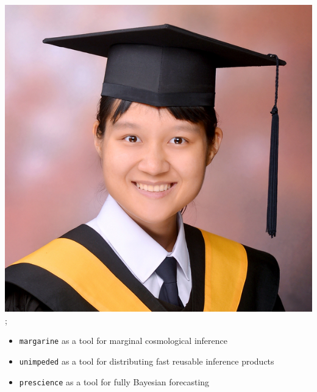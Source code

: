\documentclass[aspectratio=169]{beamer}
\begin{document}
\begin{frame}
{            \includegraphics[width=0.1\textheight]{figures/students/wei-ning_deng.jpg}%
    };
    \begin{itemize}
        \item \texttt{margarine} as a tool for marginal cosmological inference
        \item \texttt{unimpeded} as a tool for distributing fast reusable inference products
        \item \texttt{prescience} as a tool for fully Bayesian forecasting
    \end{itemize}
\end{frame}
 
\end{document}
